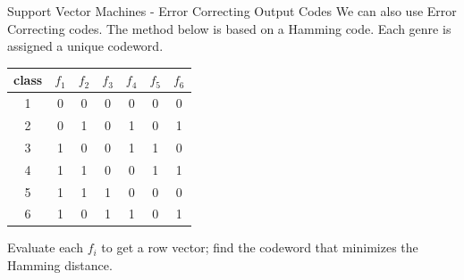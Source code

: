 \documentclass[xcolor=dvipsnames,t]{beamer} %
\begin{document}
\begin{frame}{Support Vector Machines - Error Correcting Output Codes}
   We can also use Error Correcting codes.  The method below is based on a Hamming code.  Each genre is assigned a unique codeword.

\begin{table}
   \centering
   \begin{tabular}{|c|cccccc|}
      \hline
      class&$f_{1}$ & $f_{2}$ & $f_{3}$ & $f_{4}$ & $f_{5}$ & $f_{6}$ \\\hline
      1 & 0 & 0 & 0 & 0 & 0 & 0 \\\hline
      2 & 0 & 1 & 0 & 1 & 0 & 1 \\\hline
      3 & 1 & 0 & 0 & 1 & 1 & 0 \\\hline
      4 & 1 & 1 & 0 & 0 & 1 & 1 \\\hline
      5 & 1 & 1 & 1 & 0 & 0 & 0 \\\hline
      6 & 1 & 0 & 1 & 1 & 0 & 1 \\\hline
   \end{tabular}
\end{table}

   Evaluate each $f_i$ to get a row vector; find the codeword that minimizes the Hamming distance.\\

\end{frame}
\end{document}

